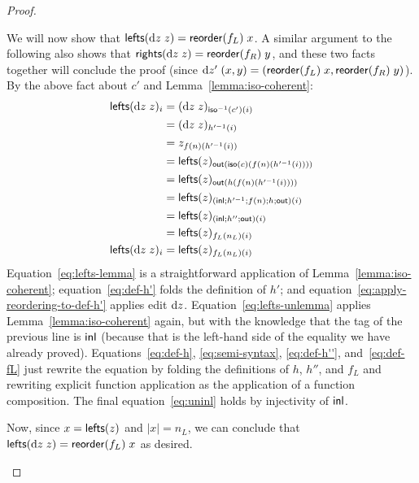 \begin{proof}
{\begin{trivlist}
    We will now show that $\mathsf{lefts}(\textrm{d} z\;z)=\mathsf{reorder}(f_L)\;x$. A similar
    argument to the following also shows that
    $\mathsf{rights}(\textrm{d} z\;z)=\mathsf{reorder}(f_R)\;y$, and these two facts together
    will conclude the proof (since
    $\textrm{d} z'\;(x,y)=(\mathsf{reorder}(f_L)\;x,\mathsf{reorder}(f_R)\;y)$). By the above
    fact about $c'$ and Lemma~\ref{lemma:iso-coherent}:
    \begin{align}
        {\mathsf{lefts}(\textrm{d}z\;z)_i}
            &= (\textrm{d} z\;z)_{\mathsf{iso}^{-1}(c')( i)}
            \label{eq:lefts-lemma}\\
            &= (\textrm{d} z\;z)_{h'^{-1}( i)}
            \label{eq:def-h'}\\
            &= z_{f(n)(h'^{-1}( i))}
            \label{eq:apply-reordering-to-def-h'}\\
            &= {\mathsf{lefts}(z)_{\mathsf{out}(\mathsf{iso}(c)(f(n)(h'^{-1}( i))))}}
            \label{eq:lefts-unlemma}\\
            &= {\mathsf{lefts}(z)_{\mathsf{out}(h(f(n)(h'^{-1}( i))))}}
            \label{eq:def-h}\\
            &= {\mathsf{lefts}(z)_{(\mathsf{inl};h'^{-1};f(n);h;\mathsf{out})(i)}}
            \label{eq:semi-syntax}\\
            &= {\mathsf{lefts}(z)_{(\mathsf{inl};h'';\mathsf{out})(i)}}
            \label{eq:def-h''}\\
            &= {\mathsf{lefts}(z)_{f_L(n_L)(i)}}
            \label{eq:def-fL}\\
        \mathsf{lefts}(\textrm{d} z\;z)_i &= \mathsf{lefts}(z)_{f_L(n_L)(i)}
            \label{eq:uninl}
    \end{align}
    Equation~\ref{eq:lefts-lemma} is a straightforward application of
    Lemma~\ref{lemma:iso-coherent}; equation~\ref{eq:def-h'} folds the
    definition of $h'$; and equation~\ref{eq:apply-reordering-to-def-h'} applies
    edit $\textrm{d} z$. Equation~\ref{eq:lefts-unlemma} applies
    Lemma~\ref{lemma:iso-coherent} again, but with the knowledge that the
    tag of the previous line is $\mathsf{inl}$ (because that is the left-hand
    side of the equality we have already proved). Equations~\ref{eq:def-h},
    \ref{eq:semi-syntax}, \ref{eq:def-h''}, and~\ref{eq:def-fL} just rewrite
    the equation by folding the definitions of $h$, $h''$, and $f_L$ and
    rewriting explicit function application as the application of a function
    composition. The final equation~\ref{eq:uninl} holds by injectivity of
    $\mathsf{inl}$.

    Now, since $x=\mathsf{lefts}(z)$ and $|x|=n_L$, we can conclude that
    $\mathsf{lefts}(\textrm{d} z\;z)=\mathsf{reorder}(f_L)\;x$ as desired.


\end{trivlist}}
\end{proof}
